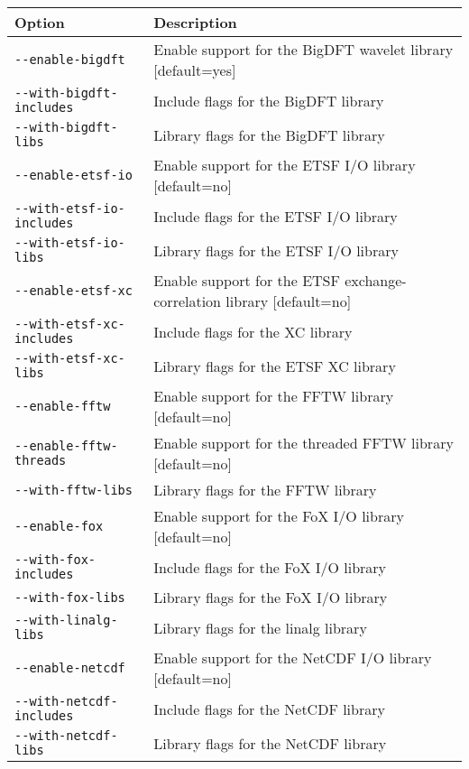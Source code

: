 \begin{table}
\begin{center}
\begin{tabular}{|l|p{9cm}|}
\hline
\textbf{Option} & \textbf{Description} \\
\hline
\texttt{-{-}enable-bigdft} & Enable support for the BigDFT wavelet library
                  [default=yes] \\
\texttt{-{-}with-bigdft-includes} & Include flags for the BigDFT library \\
\texttt{-{-}with-bigdft-libs} & Library flags for the BigDFT library \\
\hline
\texttt{-{-}enable-etsf-io} & Enable support for the ETSF I/O library
                   [default=no] \\
\texttt{-{-}with-etsf-io-includes} & Include flags for the ETSF I/O library \\
\texttt{-{-}with-etsf-io-libs} & Library flags for the ETSF I/O library \\
\hline
\texttt{-{-}enable-etsf-xc} & Enable support for the ETSF exchange-correlation library
                   [default=no] \\
\texttt{-{-}with-etsf-xc-includes} & Include flags for the XC library \\
\texttt{-{-}with-etsf-xc-libs} & Library flags for the ETSF XC library \\
\hline
\texttt{-{-}enable-fftw} & Enable support for the FFTW library
                [default=no] \\
\texttt{-{-}enable-fftw-threads} & Enable support for the threaded FFTW library
                        [default=no] \\
\texttt{-{-}with-fftw-libs} & Library flags for the FFTW library \\
\hline
\texttt{-{-}enable-fox} & Enable support for the FoX I/O library
                [default=no] \\
\texttt{-{-}with-fox-includes} & Include flags for the FoX I/O library \\
\texttt{-{-}with-fox-libs} & Library flags for the FoX I/O library \\
\hline
\texttt{-{-}with-linalg-libs} & Library flags for the linalg library \\
\hline
\texttt{-{-}enable-netcdf} & Enable support for the NetCDF I/O library
                  [default=no] \\
\texttt{-{-}with-netcdf-includes} & Include flags for the NetCDF library \\
\texttt{-{-}with-netcdf-libs} & Library flags for the NetCDF library \\

\end{tabular}
\end{center}
\end{table}
